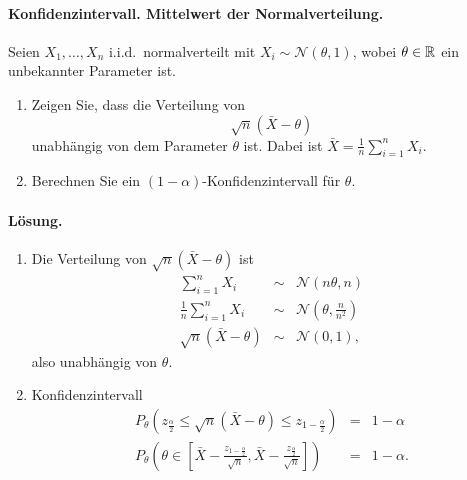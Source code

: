 \paragraph{Konfidenzintervall. Mittelwert der Normalverteilung. }
Seien $X_1,\ldots,X_n$ i.i.d.\ normalverteilt mit $X_i \sim \mathcal N \left(\theta, 1 \right)$,
wobei $\theta\in\mathbb R$ ein unbekannter Parameter ist.
\begin{enumerate}
    \item Zeigen Sie, dass die Verteilung von 
        \begin{equation}
            \sqrt{n}\left( \bar X -\theta \right)
        \end{equation}
        unabhängig von dem Parameter $\theta$ ist. Dabei ist $\bar X = \frac{1}{n} \sum_{i=1}^{n} X_i$.
    \item Berechnen Sie ein $\left( 1-\alpha \right)$-Konfidenzintervall für $\theta$.
\end{enumerate}


\paragraph*{Lösung.}
\begin{enumerate}

    \item Die Verteilung von $\sqrt{n} \left( \bar X -\theta \right)$ ist
        \begin{eqnarray}
            \sum_{i=1}^{n} X_i &\sim& \mathcal N \left( n\theta, n \right) \\
            \frac{1}{n} \sum_{i=1}^{n} X_i &\sim& \mathcal N \left( \theta, \frac{ n}{n^2} \right) \\
            \sqrt{n}\left( \bar X -\theta \right) & \sim & \mathcal N \left( 0, 1 \right),
        \end{eqnarray}
        also unabhängig von $\theta$.
    \item Konfidenzintervall
        \begin{eqnarray}
            P_\theta \left( z_{\frac{\alpha}{2}} \leq \sqrt{n}\left( \bar X -\theta \right) \leq z_{1-\frac{\alpha}{2}}  \right) &=&  1-\alpha \\
            P_\theta \left( \theta\in \left[ \bar X - \frac{z_{1-\frac{\alpha}{2}}}{\sqrt{n}}, \bar X - \frac{z_{\frac{\alpha}{2}}}{\sqrt{n}} \right] \right) &=&  1-\alpha.
        \end{eqnarray}

\end{enumerate}



